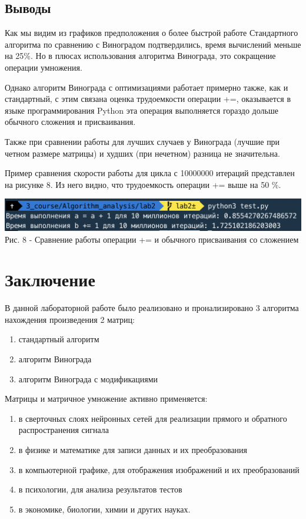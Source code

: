 \documentclass[a4paper,14pt]{article} %
\newcommand{\anonsection}[1]{\section*{#1}\addcontentsline{toc}{section}{#1}}
\begin{document}
	\subsection{Выводы}
	\hfill
	
	Как мы видим из графиков предположения о более быстрой работе Стандартного алгоритма по сравнению с Виноградом подтвердились, время вычислений меньше на 25\%. Но в плюсах использования алгоритма Винограда, это сокращение операции умножения. 
	
	Однако алгоритм Винограда с оптимизациями работает примерно также, как и стандартный, с этим связана оценка трудоемкости операции +=, оказывается в языке программирования Python эта операция выполняется гораздо дольше обычного сложения и присваивания.
	
	Также при сравнении работы для лучших случаев у Винограда (лучшие при четном размере матрицы) и худших (при нечетном) разница не значительна. 
	
	Пример сравнения скорости работы для цикла с 10000000 итераций представлен на рисунке 8. Из него видно, что трудоемкость операции += выше на 50 \%. 
	
	\begin{center}
		\includegraphics[scale = 0.8]{test} \\ Рис. 8 - Сравнение работы операции += и обычного присваивания со сложением
	\end{center}

   	\newpage

        \anonsection{Заключение}
        
        \hfill
        
        В данной лабораторной работе было реализовано и пронализировано 3 алгоритма нахождения произведения 2 матриц:
	\begin{enumerate}
	 	\item стандартный алгоритм 
		\item алгоритм Винограда
		\item алгоритм Винограда с модификациями 
	\end{enumerate}
	
	\hfill
	
	Матрицы и матричное умножение активно применяется:
	\begin{enumerate}
		\item в сверточных слоях нейронных сетей для реализации прямого и обратного распространения сигнала
		\item в физике и математике для записи данных и их преобразования
		\item в компьютерной графике, для отображения изображений и их преобразований
		\item в психологии, для анализа результатов тестов
		\item в экономике, биологии, химии и других науках. 
	\end{enumerate}
	
\end{document}
